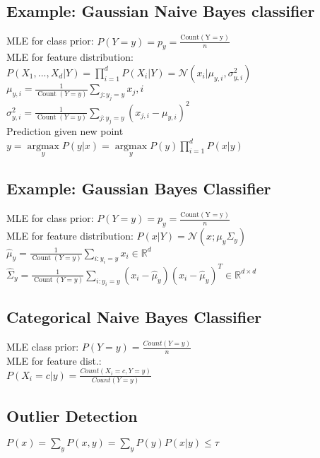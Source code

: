 \subsection*{Example: Gaussian Naive Bayes classifier}
MLE for class prior: $P(Y=y) = p_y = \frac{\operatorname{Count(Y = y)}}{n}$\\
MLE for feature distribution: $P(X_1,...,X_d|Y) = \prod_{i=1}^d P(X_i|Y) = \mathcal{N}(x_i|\mu_{y,i}, \sigma_{y,i}^2)$\\
$\mu_{y,i} = \frac{1}{\operatorname{Count}(Y=y)} \sum_{j:y_j=y} x_j,i$\\
$\sigma_{y,i}^2 = \frac{1}{\operatorname{Count}(Y=y)} \sum_{j:y_j=y} (x_{j,i} - \mu_{y,i})^2$\\
Prediction given new point\\
$y = \underset{y}{\operatorname{argmax}} P(y|x) = \underset{y}{\operatorname{argmax}} P(y) \prod_{i=1}^d P(x|y)$

\subsection*{Example: Gaussian Bayes Classifier}
MLE for class prior: $P(Y=y) = p_y = \frac{\operatorname{Count(Y = y)}}{n}$\\
MLE for feature distribution: $P(x|Y) = \mathcal{N}(x ; \mu_y \Sigma_y)$
$\hat{\mu}_{y} = \frac{1}{\operatorname{Count}(Y=y)} \sum_{i:y_i=y} x_i \in \mathbb{R}^d$\\
$\hat{\Sigma}_{y} = \frac{1}{\operatorname{Count}(Y=y)} \sum_{i:y_i=y} (x_i - \hat{\mu}_{y})(x_i-\hat{\mu}_y)^T \in \mathbb{R}^{d \times d}$\\

\subsection*{Categorical Naive Bayes Classifier}
MLE class prior: $P(Y=y) = \frac{Count(Y=y)}{n}$\\
MLE for feature dist.:\\
$P(X_i = c|y) = \frac{Count(X_i = c, Y = y)}{Count(Y=y)}$


\subsection*{Outlier Detection}
$P(x) = \sum_y P(x,y) = \sum_y P(y)P(x|y) \leq \tau$